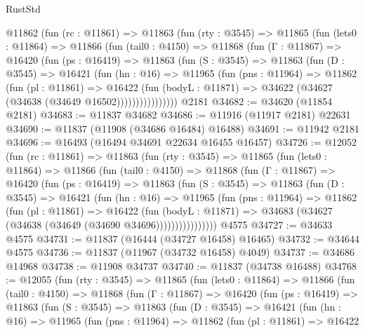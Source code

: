 \begin{lexlean}{RustStd}
\begin{coremodule}
    @11862
      (fun (rc : @11861) =>
      @11863
        (fun (rty : @3545) =>
        @11865
          (fun (lets0 : @11864) =>
          @11866
            (fun (tail0 : @4150) =>
            @11868
              (fun (Γ : @11867) =>
              @16420
                (fun (ps : @16419) =>
                @11863
                  (fun (S : @3545) =>
                  @11863
                    (fun (D : @3545) =>
                    @16421
                      (fun (hn : @16) =>
                      @11965
                        (fun (pns : @11964) =>
                        @11862
                          (fun (pl : @11861) =>
                          @16422
                            (fun (bodyL : @11871) =>
                            @34622 (@34627 (@34638 (@34649 @16502))))))))))))))))
    @2181
@34682 := @34620 (@11854 @2181)
@34683 := @11837 @34682
@34686 := @11916 (@11917 @2181) @22631
@34690 := @11837 (@11908 (@34686 @16484) @16488)
@34691 := @11942 @2181
@34696 := @16493 (@16494 @34691 @22634 @16455 @16457)
@34726 := @12052
    (fun (rc : @11861) =>
    @11863
      (fun (rty : @3545) =>
      @11865
        (fun (lets0 : @11864) =>
        @11866
          (fun (tail0 : @4150) =>
          @11868
            (fun (Γ : @11867) =>
            @16420
              (fun (ps : @16419) =>
              @11863
                (fun (S : @3545) =>
                @11863
                  (fun (D : @3545) =>
                  @16421
                    (fun (hn : @16) =>
                    @11965
                      (fun (pns : @11964) =>
                      @11862
                        (fun (pl : @11861) =>
                        @16422
                          (fun (bodyL : @11871) =>
                          @34683 (@34627 (@34638 (@34649 (@34690 @34696))))))))))))))))
    @4575
@34727 := @34633 @4575
@34731 := @11837 (@16444 (@34727 @16458) @16465)
@34732 := @34644 @4575
@34736 := @11837 (@11967 (@34732 @16458) @4049)
@34737 := @34686 @14968
@34738 := @11908 @34737
@34740 := @11837 (@34738 @16488)
@34768 := @12055
    (fun (rty : @3545) =>
    @11865
      (fun (lets0 : @11864) =>
      @11866
        (fun (tail0 : @4150) =>
        @11868
          (fun (Γ : @11867) =>
          @16420
            (fun (ps : @16419) =>
            @11863
              (fun (S : @3545) =>
              @11863
                (fun (D : @3545) =>
                @16421
                  (fun (hn : @16) =>
                  @11965
                    (fun (pns : @11964) =>
                    @11862
                      (fun (pl : @11861) =>
                      @16422

\end{coremodule}
\end{lexlean}
